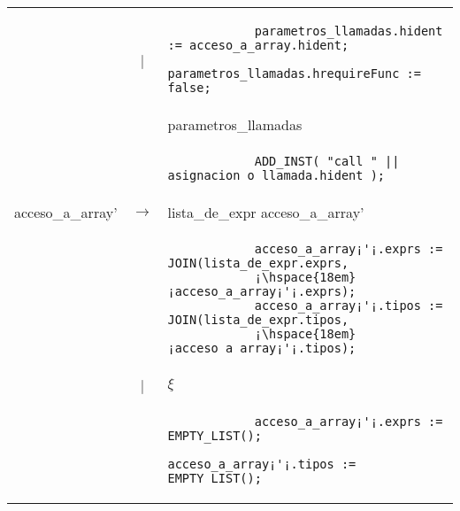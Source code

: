 \begin{tabular}{r c p{}}
							& | 					& \begin{lstlisting}
            parametros_llamadas.hident := acceso_a_array.hident;
            parametros_llamadas.hrequireFunc := false;
												\end{lstlisting} \\
							&					& parametros\_llamadas \\
							
							& 					& \begin{lstlisting}
            ADD_INST( "call " || asignacion_o_llamada.hident );
												\end{lstlisting} \\

	
			acceso\_a\_array'	& $\longrightarrow$ 	& \ter{[} lista\_de\_expr \ter{]} acceso\_a\_array' \\
								&					& \begin{lstlisting}
			acceso_a_array¡'¡.exprs := JOIN(lista_de_expr.exprs, 
			¡\hspace{18em}¡acceso_a_array¡'¡.exprs);
            acceso_a_array¡'¡.tipos := JOIN(lista_de_expr.tipos, 
            ¡\hspace{18em}¡acceso_a_array¡'¡.tipos);
            											\end{lstlisting} \\

								& | 					& $\xi$ \\
								&					& \begin{lstlisting}											
			acceso_a_array¡'¡.exprs := EMPTY_LIST();
        		acceso_a_array¡'¡.tipos := EMPTY_LIST();
                    									\end{lstlisting} \\
																
\end{tabular}

